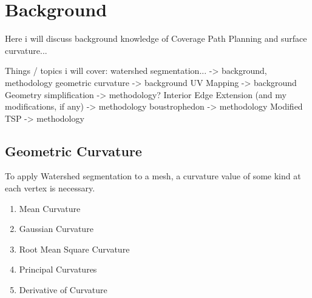 \chapter{Background}
Here i will discuss background knowledge of Coverage Path Planning and surface curvature...

Things / topics i will cover:
watershed segmentation... -> background, methodology
geometric curvature -> background
UV Mapping -> background
Geometry simplification -> methodology?
Interior Edge Extension (and my modifications, if any) -> methodology
boustrophedon -> methodology
Modified TSP -> methodology


\section{Geometric Curvature}
To apply Watershed segmentation to a mesh, a curvature value of some kind at each vertex is necessary.
\begin{enumerate}
	\item{Mean Curvature}
	\item{Gaussian Curvature}
	\item{Root Mean Square Curvature}
	\item{Principal Curvatures}
	\item{Derivative of Curvature}
\end{enumerate}

